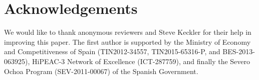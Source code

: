 \documentclass[sigconf]{acmart}
\begin{document}


\maketitle










\section*{Acknowledgements}

\indent We would like to thank anonymous reviewers and Steve Keckler for their help in improving this paper. The first author is supported by the Ministry of Economy and Competitiveness of Spain (TIN2012-34557, TIN2015-65316-P, and BES-2013-063925), HiPEAC-3 Network of Excellence (ICT-287759), and finally the Severo Ochoa Program (SEV-2011-00067) of the Spanish Government.



\end{document}
